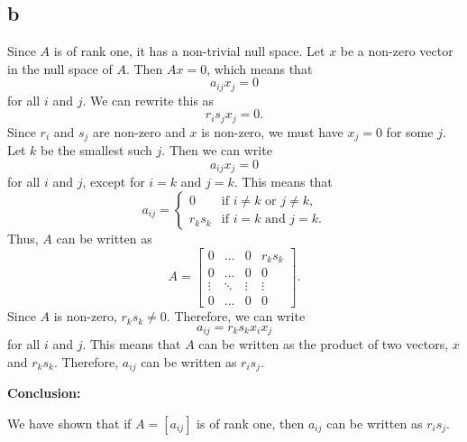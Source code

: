     \subsection{b}
    Since $A$ is of rank one, it has a non-trivial null space. Let $x$ be a non-zero vector in the null space of $A$. Then $Ax = 0$, which means that
\[a_{ij} x_j = 0\]for all $i$ and $j$. We can rewrite this as
\[r_i s_j x_j = 0.\]Since $r_i$ and $s_j$ are non-zero and $x$ is non-zero, we must have $x_j = 0$ for some $j$. Let $k$ be the smallest such $j$. Then we can write
\[a_{ij} x_j = 0\]for all $i$ and $j$, except for $i = k$ and $j = k$. This means that
\[a_{ij} = \begin{cases} 0 & \text{if } i \neq k \text{ or } j \neq k, \\ r_k s_k & \text{if } i = k \text{ and } j = k. \end{cases} \]Thus, $A$ can be written as
\[A = \begin{bmatrix} 0 & \dots & 0 & r_k s_k \\ 0 & \dots & 0 & 0 \\ \vdots & \ddots & \vdots & \vdots \\ 0 & \dots & 0 & 0 \end{bmatrix}.\]Since $A$ is non-zero, $r_k s_k \neq 0$. Therefore, we can write
\[a_{ij} = r_k s_k x_i x_j\]for all $i$ and $j$. This means that $A$ can be written as the product of two vectors, $x$ and $r_k s_k$. Therefore, $a_{ij}$ can be written as $r_i s_j$.

\textbf{Conclusion:}

We have shown that if $A = [a_{ij}]$ is of rank one, then $a_{ij}$ can be written as $r_i s_j$.
